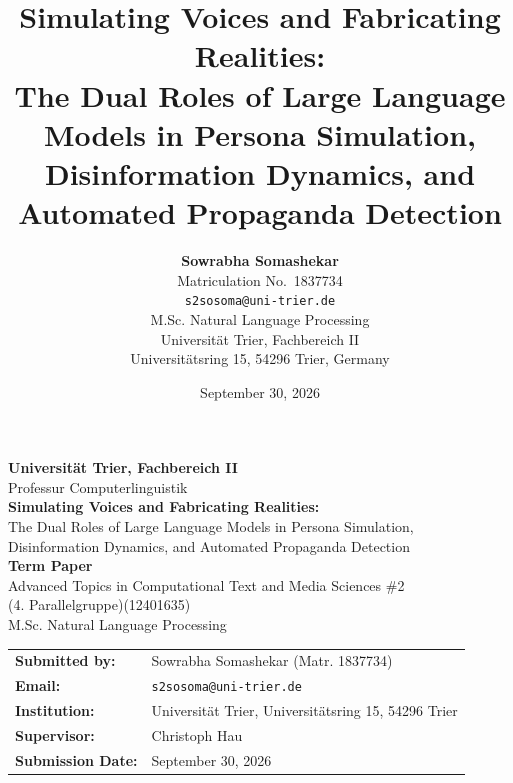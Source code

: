 \documentclass[11pt,a4paper]{article}
\title{\textbf{Simulating Voices and Fabricating Realities:}\\
\Large The Dual Roles of Large Language Models in Persona Simulation, Disinformation Dynamics, and Automated Propaganda Detection}
\author{
  \textbf{Sowrabha Somashekar} \\
  Matriculation No.\ 1837734 \\
  \texttt{s2sosoma@uni-trier.de} \\
  M.Sc. Natural Language Processing \\
  Universität Trier, Fachbereich II \\
  Universitätsring 15, 54296 Trier, Germany
}
\date{September 30, 2026}
\begin{document}

\begin{titlepage}
    \centering
    \vspace*{1.5cm}
    {\Large \textbf{Universität Trier, Fachbereich II}}\\[0.3cm]
    {\large Professur Computerlinguistik}\\[2.0cm]

    {\LARGE \textbf{Simulating Voices and Fabricating Realities:}}\\[0.4cm]
    {\Large The Dual Roles of Large Language Models in Persona Simulation,\\
    Disinformation Dynamics, and Automated Propaganda Detection}\\[2.0cm]

    {\large \textbf{Term Paper}}\\[0.3cm]
    {\large Advanced Topics in Computational Text and Media Sciences \#2}\\[0.2cm]
    {\normalsize (4. Parallelgruppe)(12401635)}\\[0.3cm]
    {\large M.Sc. Natural Language Processing}\\[2.5cm]

    \begin{tabular}{ll}
        \textbf{Submitted by:} & Sowrabha Somashekar (Matr. 1837734) \\
        \textbf{Email:} & \texttt{s2sosoma@uni-trier.de} \\
        \textbf{Institution:} & Universität Trier, Universitätsring 15, 54296 Trier \\
        \textbf{Supervisor:} & Christoph Hau \\
        \textbf{Submission Date:} & September 30, 2026 \\
    \end{tabular}
    
    \vfill
\end{titlepage}

\end{document}
